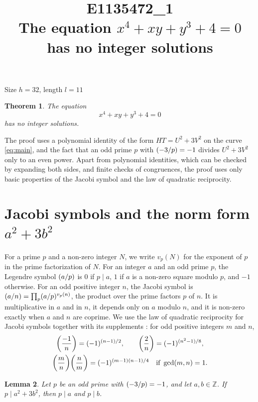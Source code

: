 \documentclass[11pt]{article}
\title{\textbf{E1135472\_1}\\[4pt] {\Large The equation $x^{4}+xy+y^{3}+4=0$ has no integer solutions}}
\author{}
\date{}
\newtheorem{theorem}{Theorem}
\newtheorem{lemma}[theorem]{Lemma}
\newcommand{\Z}{\mathbb{Z}}
\newcommand{\leg}[2]{\mathchoice{\biggl(\dfrac{#1}{#2}\biggr)}{(#1/#2)}{(#1/#2)}{(#1/#2)}}
\begin{document}
\maketitle
\vspace{-8ex}
\begin{center}
Size $h=32$, length $l=11$
\end{center}

\begin{theorem}\label{thm:main}
The equation
\begin{equation}\label{eq:main}
x^{4}+xy+y^{3}+4=0
\end{equation}
has no integer solutions.
\end{theorem}

The proof uses a polynomial identity of the form $HT=U^2+3V^2$ on the curve \eqref{eq:main}, and the fact that an odd prime $p$ with $\leg{-3}{p}=-1$ divides $U^2+3V^2$ only to an even power. Apart from polynomial identities, which can be checked by expanding both sides, and finite checks of congruences, the proof uses only basic properties of the Jacobi symbol and the law of quadratic reciprocity.

\section{\texorpdfstring{Jacobi symbols and the norm form $a^2+3b^2$}{Jacobi symbols and the norm form}}

For a prime $p$ and a non-zero integer $N$, we write $v_p(N)$ for the exponent of $p$ in the prime factorization of $N$. For an integer $a$ and an odd prime $p$, the Legendre symbol $\leg{a}{p}$ is $0$ if $p\mid a$, $1$ if $a$ is a non-zero square modulo $p$, and $-1$ otherwise. For an odd positive integer $n$, the Jacobi symbol is $\leg{a}{n}=\prod_p\leg{a}{p}^{v_p(n)}$, the product over the prime factors $p$ of $n$. It is multiplicative in $a$ and in $n$, it depends only on $a$ modulo $n$, and it is non-zero exactly when $a$ and $n$ are coprime. We use the law of quadratic reciprocity for Jacobi symbols together with its supplements \cite[Chapter~5, \S2]{IR}: for odd positive integers $m$ and $n$,
\begin{gather*}
\leg{-1}{n}=(-1)^{(n-1)/2},\qquad\leg{2}{n}=(-1)^{(n^2-1)/8},\\
\leg{m}{n}\leg{n}{m}=(-1)^{(m-1)(n-1)/4}\quad\text{if }\gcd(m,n)=1.
\end{gather*}

\begin{lemma}\label{lem:divides}
Let $p$ be an odd prime with $\leg{-3}{p}=-1$, and let $a,b\in\Z$. If $p\mid a^2+3b^2$, then $p\mid a$ and $p\mid b$.
\end{lemma}
\end{document}
